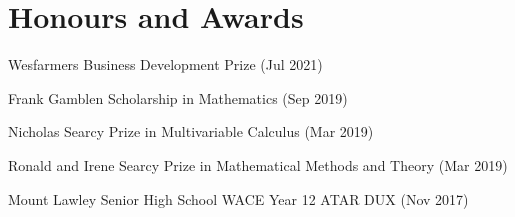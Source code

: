 \documentclass[letterpaper,10.8pt]{article}
\begin{document}
\section{Honours and Awards}
\begin{description}[font=$\bullet$]
\item {Wesfarmers Business Development Prize (Jul 2021)} 
\item {Frank Gamblen Scholarship in Mathematics (Sep 2019)}
\item {Nicholas Searcy Prize in Multivariable Calculus (Mar 2019)}
\item {Ronald and Irene Searcy Prize in Mathematical Methods and Theory (Mar 2019)}
\item {Mount Lawley Senior High School WACE Year 12 ATAR DUX (Nov 2017)}
\end{description}

\end{document}
